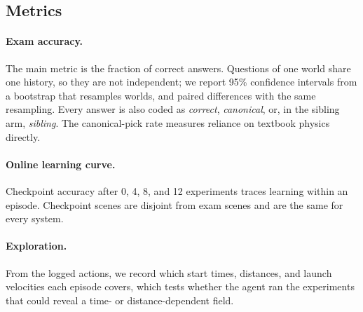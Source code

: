 \subsection{Metrics}

\paragraph{Exam accuracy.} The main metric is the fraction of correct answers. Questions of one world share one history, so they are not independent; we report 95\% confidence intervals from a bootstrap that resamples worlds, and paired differences with the same resampling. Every answer is also coded as \emph{correct}, \emph{canonical}, or, in the sibling arm, \emph{sibling}. The canonical-pick rate measures reliance on textbook physics directly.

\paragraph{Online learning curve.} Checkpoint accuracy after 0, 4, 8, and 12 experiments traces learning within an episode. Checkpoint scenes are disjoint from exam scenes and are the same for every system.

\paragraph{Exploration.} From the logged actions, we record which start times, distances, and launch velocities each episode covers, which tests whether the agent ran the experiments that could reveal a time- or distance-dependent field.
